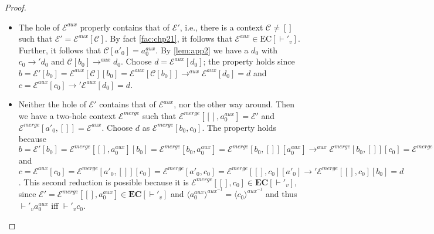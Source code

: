 \begin{proof}
\begin{itemize}
\item The hole of $\mathcal{E}^{aux}$ properly contains that of $\mathcal{E}'$, i.e., there is a context $\mathcal{C} \neq []$ such that $\mathcal{E}' = \mathcal{E}^{aux}[\mathcal{C}]$. By fact \autoref{fac:chp21}, it follows that $\mathcal{E}^{aux} \in \textrm{EC}[\vdash'_v]$. Further, it follows that $\mathcal{C}[a'_0] = a^{aux}_0$. By \autoref{lem:app2} we have a $d_0$ with $c_0 \longrightarrow' d_0$ and $\mathcal{C}[b_0] \longrightarrow^{aux} d_0$. Choose $d = \mathcal{E}^{aux}[d_0]$; the property holds since $b = \mathcal{E}'[b_0] = \mathcal{E}^{aux}[\mathcal{C}][b_0] = \mathcal{E}^{aux}[\mathcal{C}[b_0]] \longrightarrow^{aux} \mathcal{E}^{aux}[d_0] = d$ and $c = \mathcal{E}^{aux}[c_0] \longrightarrow' \mathcal{E}^{aux}[d_0] = d$.

\item Neither the hole of $\mathcal{E}'$ contains that of $\mathcal{E}^{aux}$, nor the other way around. Then we have a two-hole context $\mathcal{E}^{merge}$ such that $\mathcal{E}^{merge}[[], a^{aux}_0] = \mathcal{E}'$ and $\mathcal{E}^{merge}[a'_0, []] = \mathcal{E}^{aux}$. Choose $d$ as $\mathcal{E}^{merge}[b_0, c_0]$. The property holds because $b = \mathcal{E}'[b_0] = \mathcal{E}^{merge}[[], a^{aux}_0][b_0] = \mathcal{E}^{merge}[b_0, a^{aux}_0] = \mathcal{E}^{merge}[b_0, []][a^{aux}_0] \longrightarrow^{aux} \mathcal{E}^{merge}[b_0, []][c_0] = \mathcal{E}^{merge}[b_0, c_0] = d$ and $c = \mathcal{E}^{aux}[c_0] = \mathcal{E}^{merge}[a'_0, []][c_0] = \mathcal{E}^{merge}[a'_0, c_0] = \mathcal{E}^{merge}[[], c_0][a'_0] \longrightarrow' \mathcal{E}^{merge}[[], c_0][b_0] = d$. This second reduction is possible because it is $\mathcal{E}^{merge}[[], c_0] \in \mathbf{EC}[\vdash'_v]$, since $\mathcal{E}' = \mathcal{E}^{merge}[[], a^{aux}_0] \in \mathbf{EC}[\vdash'_v]$ and $\langle a^{aux}_0 \rangle^{aux^{-1}} = \langle c_0 \rangle^{aux^{-1}}$ and thus $\vdash'_v a^{aux}_0$ iff $\vdash'_v c_0$.
\end{itemize}

\end{proof}

